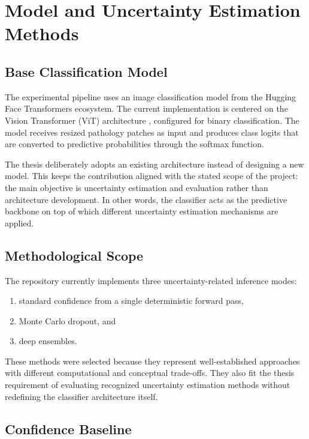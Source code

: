 \chapter{Model and Uncertainty Estimation Methods}
\label{chap:model_methods}

\section{Base Classification Model}

The experimental pipeline uses an image classification model from the Hugging Face Transformers ecosystem. The current implementation is centered on the Vision Transformer (ViT) architecture \cite{dosovitskiy2021image}, configured for binary classification. The model receives resized pathology patches as input and produces class logits that are converted to predictive probabilities through the softmax function.

The thesis deliberately adopts an existing architecture instead of designing a new model. This keeps the contribution aligned with the stated scope of the project: the main objective is uncertainty estimation and evaluation rather than architecture development. In other words, the classifier acts as the predictive backbone on top of which different uncertainty estimation mechanisms are applied.

\section{Methodological Scope}

The repository currently implements three uncertainty-related inference modes:

\begin{enumerate}
    \item standard confidence from a single deterministic forward pass,
    \item Monte Carlo dropout, and
    \item deep ensembles.
\end{enumerate}

These methods were selected because they represent well-established approaches with different computational and conceptual trade-offs. They also fit the thesis requirement of evaluating recognized uncertainty estimation methods without redefining the classifier architecture itself.

\section{Confidence Baseline}

